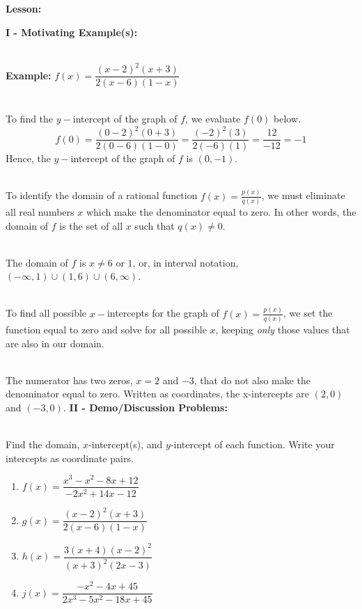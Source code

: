 \documentclass[12pt]{article}
\theoremstyle{definition}
\newtheorem{example}{Example}
\begin{document}
{\bf Lesson:}
\par
{\bf I - Motivating Example(s):}\\
\ \par
{\bf Example:}  $f(x)=\dfrac{(x-2)^2(x+3)}{2(x-6)(1-x)}$\\
\ \par
To find the $y-$intercept of the graph of $f$, we evaluate $f(0)$ below.
$$f(0)=\dfrac{(0-2)^2(0+3)}{2(0-6)(1-0)}=\dfrac{(-2)^2(3)}{2(-6)(1)}=\dfrac{12}{-12}=-1$$
Hence, the $y-$intercept of the graph of $f$ is $(0,-1)$.\\
\ \par
To identify the domain of a rational function $f(x)=\frac{p(x)}{q(x)}$, we must eliminate all real numbers $x$ which make the denominator equal to zero.  In other words, the domain of $f$ is the set of all $x$ such that $q(x)\neq 0$.\\
\ \par
The domain of $f$ is $x\neq 6$ or  $1$, or, in interval notation, $(-\infty,1)\cup(1,6)\cup(6,\infty)$.\\
\ \par
To find all possible $x-$intercepts for the graph of $f(x)=\frac{p(x)}{q(x)}$, we set the function equal to zero and solve for all possible $x$, keeping {\it only} those values that are also in our domain.\\
\ \par
The numerator has two zeros, $x=2$ and $-3$, that do not also make the denominator equal to zero. Written as coordinates, the x-intercepts are $(2,0)$ and $(-3, 0)$.
\newpage
{\bf II - Demo/Discussion Problems:}\\
\ \par
Find the domain, $x$-intercept(s), and $y$-intercept of each function.  Write your intercepts as coordinate pairs.
\begin{enumerate}
\item $f(x)=\dfrac{x^3-x^2-8x+12}{-2x^2+14x-12}$\\
\item $g(x)=\dfrac{(x-2)^2(x+3)}{2(x-6)(1-x)}$\\
\item $h(x)=\dfrac{3(x+4)(x-2)^2}{(x+3)^2(2x-3)}$\\
\item $j(x)=\dfrac{-x^2-4x+45}{2x^3-5x^2-18x+45}$\\
\end{enumerate}
\end{document}
